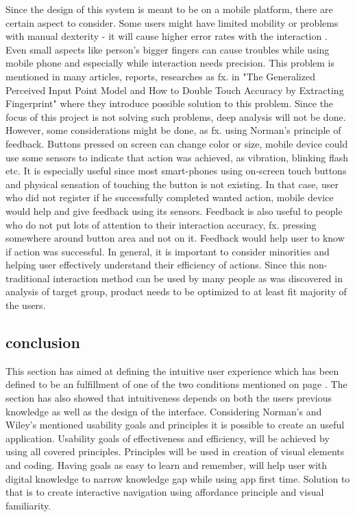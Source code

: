 Since the design of this system is meant to be on a mobile platform, there are certain aspect to consider. Some users might have limited mobility or problems with manual dexterity - it will cause higher error rates with the interaction \cite{Wileys}. Even small aspects like person's bigger fingers can cause troubles while using mobile phone and especially while interaction needs precision. This problem is mentioned in many articles, reports, researches as fx. in "The Generalized Perceived Input Point Model and How to Double Touch Accuracy by Extracting Fingerprint" where they introduce possible solution to this problem. Since the focus of this project is not solving such problems, deep analysis will not be done. However, some considerations might be done, as fx. using Norman's principle of feedback. Buttons pressed on screen can change color or size, mobile device could use some sensors to indicate that action was achieved, as vibration, blinking flash etc. It is especially useful since most smart-phones using on-screen touch buttons and physical sensation of touching the button is not existing.  In that case, user who did not register if he successfully completed wanted action, mobile device would help and give feedback using its sensors. Feedback is also useful to people who do not put lots of attention to their interaction accuracy, fx. pressing somewhere around button area and not on it. Feedback would help user to know if action was successful. 
In general, it is important to consider minorities and helping user effectively understand their efficiency of actions. Since this non-traditional interaction method can be used by many people as was discovered in analysis of target group, product needs to be optimized to at least fit majority of the users. 

\subsection{conclusion}
This section has aimed at defining the intuitive user experience which has been defined to be an fulfillment of one of the two conditions mentioned on page \pageref{intuitiveConditions}. The section has also showed that intuitiveness depends on both the users previous knowledge as well as the design of the interface. Considering Norman's and Wiley's mentioned usability goals and principles it is 
possible to create an useful application. Usability goals of effectiveness and 
efficiency, will be achieved by using all covered principles. Principles will be 
used in creation of visual elements and coding. Having goals as easy to learn and 
remember, will help user with digital knowledge to narrow knowledge gap while 
using app first time. Solution to that is to create interactive navigation using 
affordance principle and visual familiarity.\label{EvalConUsability}
